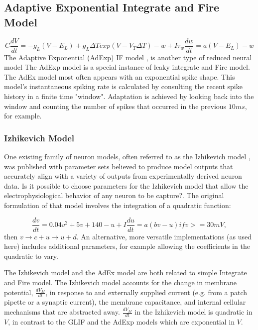 \subsection{Adaptive Exponential Integrate and Fire Model}
\begin{displaymath}
 C\frac{dV}{dt}=-g_{L}(V-E_{L})+
g_{L} \Delta Texp(V-V_{T} \Delta T)-w+I 
\tau_{w}\frac{dw}{dt} = a(V-E_{L})-w 
\end{displaymath}
The Adaptive Exponential (AdExp) IF model \citep{brette2005adaptive}, is another type of reduced neural model
The AdExp model is a special instance of leaky integrate and Fire model. The AdEx model most often appears with an exponential spike shape.
This model's instantaneous spiking rate is calculated by consulting the recent spike history in a finite time "window". 
Adaptation is achieved by looking back into the window and counting the number of spikes that occurred in the previous $10ms$, for example. 
\subsubsection{Izhikevich Model}
One existing family of neuron models, often referred to as the Izhikevich model \citep{izhikevich2003simple}, was published with parameter sets believed to produce model outputs that accurately align with a variety of outputs from experimentally derived neuron data.
Is it possible to choose parameters for the Izhikevich model that allow the electrophysiological behavior of any neuron to be capture?.
The original formulation of that model involves the integration of a quadratic function:

\begin{displaymath}
\frac{dv}{dt}=0.04v^{2}+5v+140-u+I
\frac{du}{dt} = a(bv-u)
if v>=30mV,
\end{displaymath}
 then $ v \rightarrow c + u 	\rightarrow u+ d$.
An alternative, more versatile implementations (as used here) includes additional parameters, for example allowing the coefficients in the quadratic to vary.

The Izhikevich model and the AdEx model are both related to simple Integrate and Fire model.
The Izhikevich model accounts for the change in membrane potential, $\frac{dV_{M}}{dt}$, in response to and externally supplied current (e.g. from a patch pipette or a synaptic current), the membrane capacitance, and internal cellular mechanisms that are abstracted away.
$\frac{dV_{M}}{dt}$ in the Izhikevich model is quadratic in $V$, in contrast to the GLIF and the AdExp models which are exponential in $V$.

